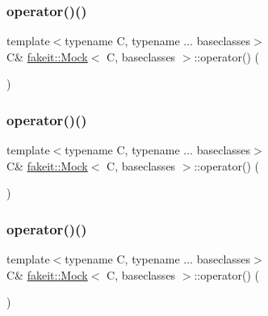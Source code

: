 \subsubsection{\texorpdfstring{operator()()}{operator()()}\hspace{0.1cm}{\footnotesize\ttfamily [2/9]}}
{\footnotesize\ttfamily template$<$typename C, typename ... baseclasses$>$ \\
C\& \mbox{\hyperlink{classfakeit_1_1Mock}{fakeit\+::\+Mock}}$<$ C, baseclasses $>$\+::operator() (\begin{DoxyParamCaption}{ }\end{DoxyParamCaption})\hspace{0.3cm}{\ttfamily [inline]}}

\mbox{\label{classfakeit_1_1Mock_a128ca35e5c7648e0612f017cb7076498}} 
\subsubsection{\texorpdfstring{operator()()}{operator()()}\hspace{0.1cm}{\footnotesize\ttfamily [3/9]}}
{\footnotesize\ttfamily template$<$typename C, typename ... baseclasses$>$ \\
C\& \mbox{\hyperlink{classfakeit_1_1Mock}{fakeit\+::\+Mock}}$<$ C, baseclasses $>$\+::operator() (\begin{DoxyParamCaption}{ }\end{DoxyParamCaption})\hspace{0.3cm}{\ttfamily [inline]}}

\mbox{\label{classfakeit_1_1Mock_a128ca35e5c7648e0612f017cb7076498}} 
\subsubsection{\texorpdfstring{operator()()}{operator()()}\hspace{0.1cm}{\footnotesize\ttfamily [4/9]}}
{\footnotesize\ttfamily template$<$typename C, typename ... baseclasses$>$ \\
C\& \mbox{\hyperlink{classfakeit_1_1Mock}{fakeit\+::\+Mock}}$<$ C, baseclasses $>$\+::operator() (\begin{DoxyParamCaption}{ }\end{DoxyParamCaption})\hspace{0.3cm}{\ttfamily [inline]}}

